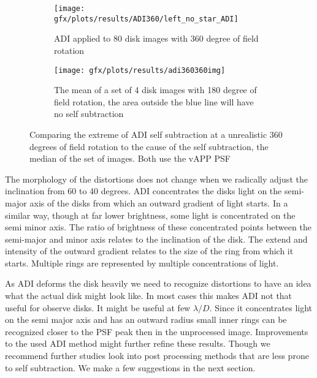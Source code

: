 \begin{figure}[h!]
      \begin{subfigure}[t]{0.5\textwidth}
        \texttt{[image: gfx/plots/results/ADI360/left\_no\_star\_ADI]}
        \caption{ADI applied to 80 disk images with 360 degree of field rotation}
      \end{subfigure}
      \begin{subfigure}[t]{0.5 \textwidth}
        \texttt{[image: gfx/plots/results/adi360360img]}
        \caption{The mean of a set of 4 disk images with 180 degree of field rotation, the area outside the blue line will have no self subtraction}
        \label{fig:adi_why_doomed_b}
      \end{subfigure}%
           
  \caption{Comparing the extreme of \ac{ADI} self subtraction at a unrealistic 360 degrees of field rotation to the cause of the self subtraction, the median of the set of images. Both use the \ac{vAPP} \ac{PSF}}
  \label{fig:adi_why_doomed}
\end{figure}

The morphology of the distortions does not change when we radically adjust the inclination from 60 to 40 degrees. \ac{ADI} concentrates the disks light on the semi-major axis of the disks from which an outward gradient of light starts. In a similar way, though at far lower brightness, some light is concentrated on the semi minor axis. The ratio of brightness of these concentrated points between the semi-major and minor axis relates to the inclination of the disk. The extend and intensity of the outward gradient relates to the size of the ring from which it starts. Multiple rings are represented by multiple concentrations of light.

As \ac{ADI} deforms the disk heavily we need to recognize distortions to have an idea what the actual disk might look like. In most cases this makes \ac{ADI} not that useful for observe disks. It might be useful at few $\lambda/D$. Since it concentrates light on the semi major axis and has an outward radius small inner rings can be recognized closer to the \ac{PSF} peak then in the unprocessed image. Improvements to the used \ac{ADI} method might further refine these results. Though we recommend further studies look into post processing methods that are less prone to self subtraction. We make a few suggestions in the next section.
